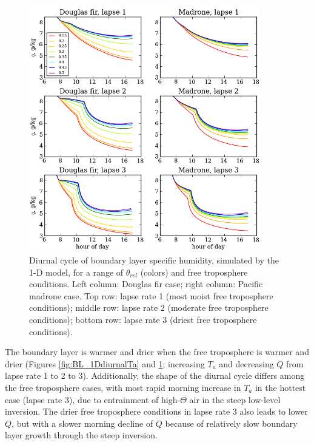 \begin{figure}[here]
\includegraphics[width=0.9\textwidth]{ch2-BL/figures/testall_compare_sm_lapse_q_cropped.png}
\caption{Diurnal cycle of boundary layer specific humidity, simulated by the 1-D model, for a range of $\theta_{rel}$ (colors) and free troposphere conditions.  Left column: Douglas fir case; right column: Pacific madrone case.  Top row: lapse rate 1 (most moist free troposphere conditions); middle row: lapse rate 2 (moderate free troposphere conditions); bottom row: lapse rate 3 (driest free troposphere conditions).}
\label{fig:BL_1DdiurnalQ}
\end{figure}


The boundary layer is warmer and drier when the free troposphere is warmer and drier (Figures \ref{fig:BL_1DdiurnalTa} and \ref{fig:BL_1DdiurnalQ}; increasing $T_a$ and decreasing $Q$ from lapse rate 1 to 2 to 3).  Additionally, the shape of the diurnal cycle differs among the free troposphere cases, with most rapid morning increase in $T_a$ in the hottest case (lapse rate 3), due to entrainment of high-$\Theta$ air in the steep low-level inversion.  The drier free troposphere conditions in lapse rate 3 also leads to lower $Q$, but with a slower morning decline of $Q$ because of relatively slow boundary layer growth through the steep inversion.

